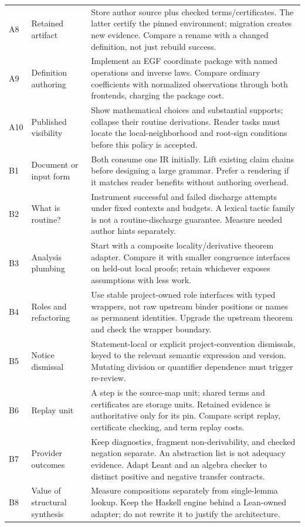 \documentclass[11pt,a4paper]{article}
\theoremstyle{definition}
\begin{document}
\begin{longtable}{@{}P{.065\textwidth}P{.23\textwidth}P{.615\textwidth}@{}}
A8 & Retained artifact & Store author source plus checked terms/certificates. The latter certify the pinned environment; migration creates new evidence. Compare a rename with a changed definition, not just rebuild success.\\
A9 & Definition authoring & Implement an EGF coordinate package with named operations and inverse laws. Compare ordinary coefficients with normalized observations through both frontends, charging the package cost.\\
A10 & Published visibility & Show mathematical choices and substantial supports; collapse their routine derivations. Reader tasks must locate the local-neighborhood and root-sign conditions before this policy is accepted.\\
\midrule
B1 & Document or input form & Both consume one IR initially. Lift existing claim chains before designing a large grammar. Prefer a rendering if it matches reader benefits without authoring overhead.\\
B2 & What is routine? & Instrument successful and failed discharge attempts under fixed contexts and budgets. A lexical tactic family is not a routine-discharge guarantee. Measure needed author hints separately.\\
B3 & Analysis plumbing & Start with a composite locality/derivative theorem adapter. Compare it with smaller congruence interfaces on held-out local proofs; retain whichever exposes assumptions with less work.\\
B4 & Roles and refactoring & Use stable project-owned role interfaces with typed wrappers, not raw upstream binder positions or names as permanent identities. Upgrade the upstream theorem and check the wrapper boundary.\\
B5 & Notice dismissal & Statement-local or explicit project-convention dismissals, keyed to the relevant semantic expression and version. Mutating division or quantifier dependence must trigger re-review.\\
B6 & Replay unit & A step is the source-map unit; shared terms and certificates are storage units. Retained evidence is authoritative only for its pin. Compare script replay, certificate checking, and term replay costs.\\
B7 & Provider outcomes & Keep diagnostics, fragment non-derivability, and checked negation separate. An abstraction list is not adequacy evidence. Adapt Leant and an algebra checker to distinct positive and negative transfer contracts.\\
B8 & Value of structural synthesis & Measure compositions separately from single-lemma lookup. Keep the Haskell engine behind a Lean-owned adapter; do not rewrite it to justify the architecture.\\

\end{longtable}
\end{document}
